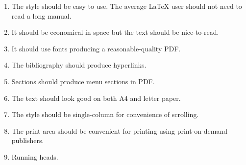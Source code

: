 \documentclass[EPiC]{easychair}
\begin{document}
\begin{enumerate}
\item
The style should be easy to use. 
The average {\LaTeX} user should not need to read a long manual.

\item
It should be economical in space but the text should be nice-to-read.

\item
It should use fonts producing a reasonable-quality PDF.

\item
The bibliography should produce hyperlinks.

\item
Sections should produce menu sections in PDF.

\item
The text should look good on both A4 and letter paper.

\item
The style should be single-column for convenience of scrolling.

\item
The print area should be convenient for printing using print-on-demand publishers.

\item
Running heads.
\end{enumerate}


\end{document}

